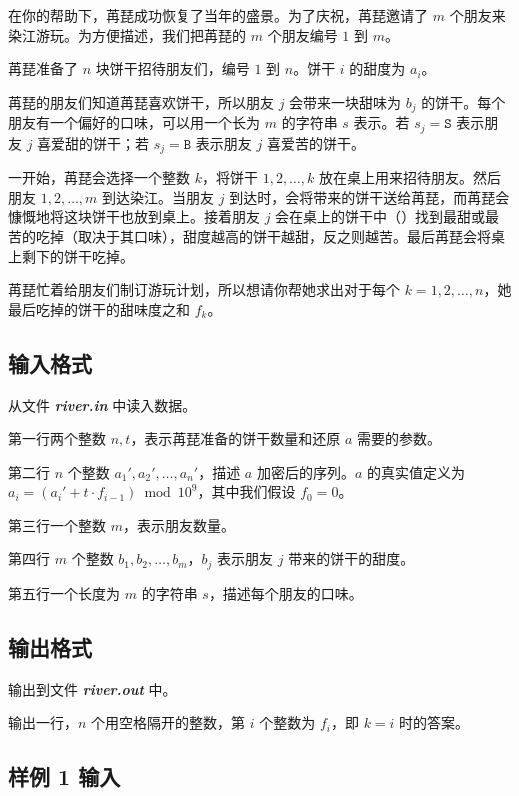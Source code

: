 \documentclass[12pt]{article}                               %
\newcommand{\filename}[1]{{\textbf{\textit{#1}}}}           %
\newcommand{\myemph}[1]{{\textbf{\CJKunderdot{#1}}}}        %
\begin{document}
	在你的帮助下，苒琵成功恢复了当年的盛景。为了庆祝，苒琵邀请了 $m$ 个朋友来染江游玩。为方便描述，我们把苒琵的 $m$ 个朋友编号 $1$ 到 $m$。

	苒琵准备了 $n$ 块饼干招待朋友们，编号 $1$ 到 $n$。饼干 $i$ 的甜度为 $a_i$。

	苒琵的朋友们知道苒琵喜欢饼干，所以朋友 $j$ 会带来一块甜味为 $b_j$ 的饼干。每个朋友有一个偏好的口味，可以用一个长为 $m$ 的字符串 $s$ 表示。若 $s_j=\mathtt{S}$ 表示朋友 $j$ 喜爱甜的饼干；若 $s_j=\mathtt{B}$ 表示朋友 $j$ 喜爱苦的饼干。

	一开始，苒琵会选择一个整数 $k$，将饼干 $1,2,\ldots,k$ 放在桌上用来招待朋友。然后朋友 $1,2,\ldots,m$ \myemph{依次}到达染江。当朋友 $j$ 到达时，会将带来的饼干送给苒琵，而苒琵会慷慨地将这块饼干也放到桌上。接着朋友 $j$ 会在桌上的饼干中（\myemph{包括朋友 $j$ 带来的}）找到最甜或最苦的吃掉（取决于其口味），甜度越高的饼干越甜，反之则越苦。最后苒琵会将桌上剩下的饼干吃掉。

	苒琵忙着给朋友们制订游玩计划，所以想请你帮她求出对于每个 $k=1,2,\ldots,n$，她最后吃掉的饼干的甜味度之和 $f_k$。

	\subsection{输入格式}

	从文件 \filename{river.in} 中读入数据。

	第一行两个整数 $n,t$，表示苒琵准备的饼干数量和还原 $a$ 需要的参数。

	第二行 $n$ 个整数 $a_1',a_2',\ldots,a_n'$，描述 $a$ 加密后的序列。$a$ 的真实值定义为 $a_i=(a_i'+t\cdot f_{i-1})\bmod 10^9$，其中我们假设 $f_0=0$。

	第三行一个整数 $m$，表示朋友数量。

	第四行 $m$ 个整数 $b_1,b_2,\ldots,b_m$，$b_j$ 表示朋友 $j$ 带来的饼干的甜度。

	第五行一个长度为 $m$ 的字符串 $s$，描述每个朋友的口味。

	\subsection{输出格式}

	输出到文件 \filename{river.out} 中。

	输出一行，$n$ 个用空格隔开的整数，第 $i$ 个整数为 $f_i$，即 $k=i$ 时的答案。

	\subsection{样例 1 输入}
\end{document}
